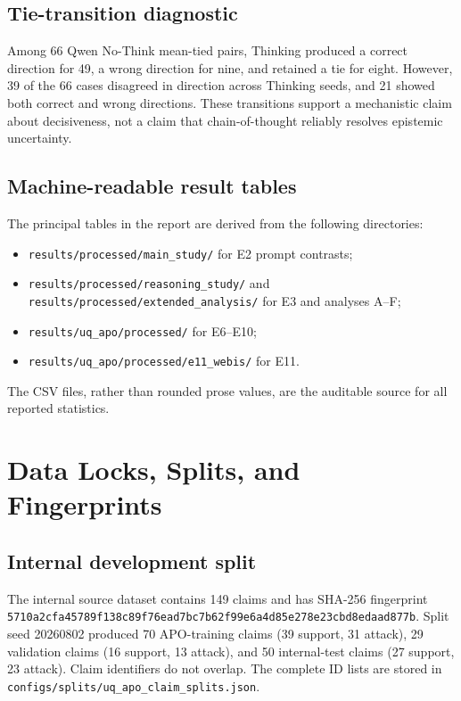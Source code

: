 \documentclass[11pt,twoside,a4paper]{report}
\begin{document}
\section{Tie-transition diagnostic}

Among 66 Qwen No-Think mean-tied pairs, Thinking produced a correct direction
for 49, a wrong direction for nine, and retained a tie for eight.  However,
39 of the 66 cases disagreed in direction across Thinking seeds, and 21 showed
both correct and wrong directions.  These transitions support a mechanistic
claim about decisiveness, not a claim that chain-of-thought reliably resolves
epistemic uncertainty.

\section{Machine-readable result tables}

The principal tables in the report are derived from the following directories:
\begin{itemize}
  \item \texttt{results/processed/main\_study/} for E2 prompt contrasts;
  \item \texttt{results/processed/reasoning\_study/} and
        \texttt{results/processed/extended\_analysis/} for E3 and analyses A--F;
  \item \texttt{results/uq\_apo/processed/} for E6--E10;
  \item \texttt{results/uq\_apo/processed/e11\_webis/} for E11.
\end{itemize}
The CSV files, rather than rounded prose values, are the auditable source for
all reported statistics.


\chapter{Data Locks, Splits, and Fingerprints}
\label{app:data-locks}

\section{Internal development split}

The internal source dataset contains 149 claims and has SHA-256 fingerprint
\texttt{5710a2cfa45789f138c89f76ead7bc7b62f99e6a4d85e278e23cbd8edaad877b}.
Split seed 20260802 produced 70 APO-training claims (39 support, 31 attack),
29 validation claims (16 support, 13 attack), and 50 internal-test claims
(27 support, 23 attack).  Claim identifiers do not overlap.  The complete ID
lists are stored in \texttt{configs/splits/uq\_apo\_claim\_splits.json}.
\end{document}
